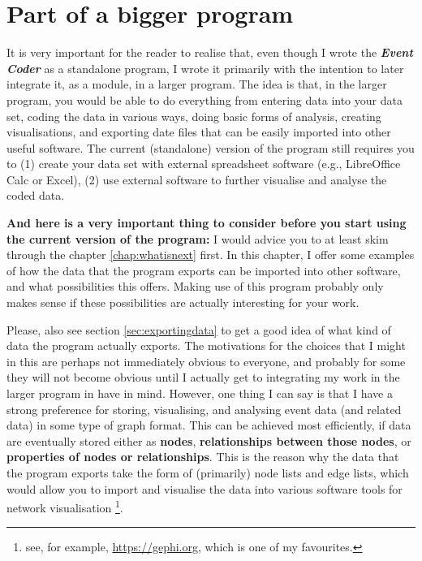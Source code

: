 \documentclass{memoir}
\begin{document}
\section{Part of a bigger program}
\label{sec:partofbiggerprogram}

It is very important for the reader to realise that, even though I wrote the \textbf{\emph{Event Coder}} as a standalone program, I wrote it primarily with the intention to later integrate it, as a module, in a larger program. The idea is that, in the larger program, you would be able to do everything from entering data into your data set, coding the data in various ways, doing basic forms of analysis, creating visualisations, and exporting date files that can be easily imported into other useful software. The current (standalone) version of the program still requires you to (1) create your data set with external spreadsheet software (e.g., LibreOffice Calc or Excel), (2) use external software to further visualise and analyse the coded data.

\textbf{And here is a very important thing to consider before you start using the current version of the program:} I would advice you to at least skim through the chapter \ref{chap:whatisnext} first. In this chapter, I offer some examples of how the data that the program exports can be imported into other software, and what possibilities this offers. Making use of this program probably only makes sense if these possibilities are actually interesting for your work.

Please, also see section \ref{sec:exportingdata} to get a good idea of what kind of data the program actually exports. The motivations for the choices that I might in this are perhaps not immediately obvious to everyone, and probably for some they will not become obvious until I actually get to integrating my work in the larger program in have in mind. However, one thing I can say is that I have a strong preference for storing, visualising, and analysing event data (and related data) in some type of graph format. This can be achieved most efficiently, if data are eventually stored either as \textbf{nodes}, \textbf{relationships between those nodes}, or \textbf{properties of nodes or relationships}. This is the reason why the data that the program exports take the form of (primarily) node lists and edge lists, which would allow you to import and visualise the data into various software tools for network visualisation \footnote{see, for example, \url{https://gephi.org}, which is one of my favourites.}.  
\end{document}
